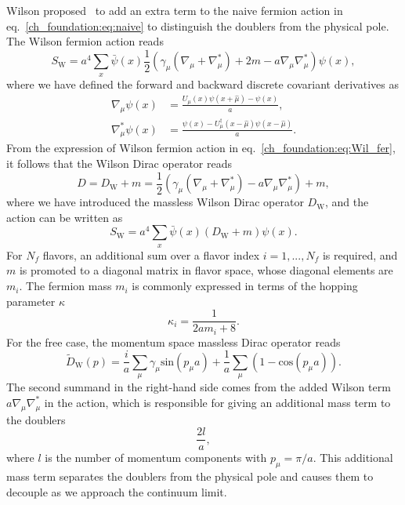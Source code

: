 Wilson proposed~\citep{Wilson:1974sk} to add an extra term to the naive fermion action in eq.~\eqref{ch_foundation:eq:naive} to distinguish the doublers from the physical pole. The Wilson fermion action reads
\begin{equation}
\label{ch_foundation:eq:Wil_fer}
S_{\textrm{W}}=a^4\sum_x\bar{\psi}(x)\frac{1}{2}\left(\gamma_{\mu}\left(\nabla_{\mu}+\nabla_{\mu}^*\right)+2m-a\nabla_{\mu}\nabla_{\mu}^*\right)\psi(x),
\end{equation}
where we have defined the forward and backward discrete covariant derivatives as
\begin{align}
\nabla_{\mu}\psi(x)&=\frac{U_{\mu}(x)\psi(x+\hat{\mu})-\psi(x)}{a},\\
\nabla_{\mu}^*\psi(x)&=\frac{\psi(x)-U_{\mu}^{\dagger}(x-\hat{\mu})\psi(x-\hat{\mu})}{a}.
\end{align}
From the expression of Wilson fermion action in eq.~\eqref{ch_foundation:eq:Wil_fer}, it follows that the Wilson Dirac operator reads
\begin{equation}
\label{ch_foundation:eq:DW}
D=D_{\textrm{W}}+m=\frac{1}{2}\left(\gamma_{\mu}\left(\nabla_{\mu}+\nabla_{\mu}^*\right)-a\nabla_{\mu}\nabla_{\mu}^*\right)+m,
\end{equation}
where we have introduced the massless Wilson Dirac operator $D_{\textrm{W}}$, and the action can be written as
\begin{equation}
S_{\textrm{W}}=a^4\sum_x\bar{\psi}(x)\left(D_{\textrm{W}}+m\right)\psi(x).
\end{equation}
For $N_f$ flavors, an additional sum over a flavor index $i=1,...,N_f$ is required, and $m$ is promoted to a diagonal matrix in flavor space, whose diagonal elements are $m_i$. The fermion mass $m_i$ is commonly expressed in terms of the hopping parameter $\kappa$
\begin{equation}
\label{ch_foundation:eq:kappa}
\kappa_i=\frac{1}{2am_i+8}.
\end{equation}
For the free case, the momentum space massless Dirac operator reads
\begin{equation}
\tilde{D}_{\textrm{W}}(p)=\frac{i}{a}\sum_{\mu}\gamma_{\mu}\textrm{sin}(p_{\mu}a)+\frac{1}{a}\sum_{\mu}\left(1-\textrm{cos}(p_{\mu}a)\right).
\end{equation}
The second summand in the right-hand side comes from the added Wilson term $a\nabla_{\mu}\nabla_{\mu}^*$ in the action, which is responsible for giving an additional mass term to the doublers
\begin{equation}
\frac{2l}{a},
\end{equation}
where $l$ is the number of momentum components with $p_{\mu}=\pi/a$. This additional mass term separates the doublers from the physical pole and causes them to decouple as we approach the continuum limit.

